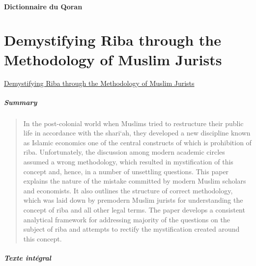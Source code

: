  
 \paragraph{Dictionnaire du Qoran}
 

 \section{Demystifying Riba through the Methodology of Muslim Jurists}
 \href{https://www.proquest.com/docview/2352353188?accountid=143046&parentSessionId=Sg7rHgjzHS0M9aF4pv1Nx2pxOOyR5LkKvILKrOVqG1o\%3D&pq-origsite=summon}{Demystifying Riba through the Methodology of Muslim Jurists}
 

 \subparagraph{Summary}
  \begin{quote}
  In the post-colonial world when Muslims tried to restructure their public life in accordance with the shari‘ah, they developed a new discipline known as Islamic economics one of the central constructs of which is prohibition of riba. Unfortunately, the discussion among modern academic circles assumed a wrong methodology, which resulted in mystification of this concept and, hence, in a number of unsettling questions. This paper explains the nature of the mistake committed by modern Muslim scholars and economists. It also outlines the structure of correct methodology, which was laid down by premodern Muslim jurists for understanding the concept of riba and all other legal terms. The paper develops a consistent analytical framework for addressing majority of the questions on the subject of riba and attempts to rectify the mystification created around this concept.
  
  \end{quote}
 \subparagraph{Texte intégral}
